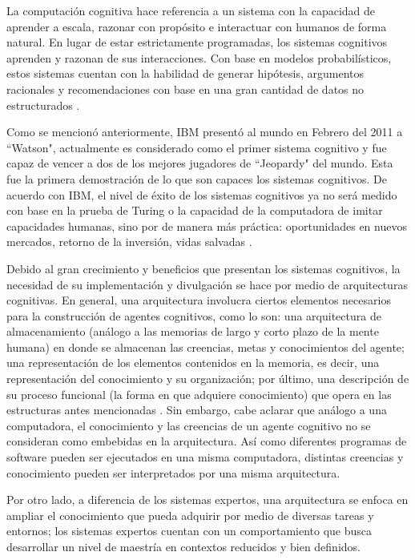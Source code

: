 La computaci\'{o}n cognitiva hace referencia a un sistema con la capacidad de aprender a escala, razonar con prop\'{o}sito e interactuar con humanos de forma natural. En lugar de estar estrictamente programadas, los sistemas cognitivos aprenden y razonan de sus interacciones. Con base en modelos probabil\'{i}sticos, estos sistemas cuentan con la habilidad de generar hip\'{o}tesis, argumentos racionales y recomendaciones con base en una gran cantidad de datos no estructurados \cite{ibmcc}.

Como se mencion\'{o} anteriormente, IBM present\'{o} al mundo en Febrero del 2011 a “Watson", actualmente es considerado como el primer sistema cognitivo y fue capaz de vencer a dos de los mejores jugadores de “Jeopardy" del mundo. Esta fue la primera demostraci\'{o}n de lo que son capaces los sistemas cognitivos. De acuerdo con IBM, el nivel de \'{e}xito de los sistemas cognitivos ya no ser\'{a} medido con base en la prueba de Turing o la capacidad de la computadora de imitar capacidades humanas, sino por de manera m\'{a}s pr\'{a}ctica: oportunidades en nuevos mercados, retorno de la inversi\'{o}n, vidas salvadas \cite{ibmcc}.

Debido al gran crecimiento y beneficios que presentan los sistemas cognitivos, la necesidad de su implementaci\'{o}n y divulgaci\'{o}n se hace por medio de arquitecturas cognitivas. En general, una arquitectura involucra ciertos elementos necesarios para la construcci\'{o}n de agentes cognitivos, como lo son: una arquitectura de almacenamiento (an\'{a}logo a las memorias de largo y corto plazo de la mente humana) en donde se almacenan las creencias, metas y conocimientos del agente; una representaci\'{o}n de los elementos contenidos en la memoria, es decir, una representaci\'{o}n del conocimiento y su organizaci\'{o}n; por \'{u}ltimo, una descripci\'{o}n de su proceso funcional (la forma en que adquiere conocimiento) que opera en las estructuras antes mencionadas \cite{langley2009cognitive}. Sin embargo, cabe aclarar que an\'{a}logo a una computadora, el conocimiento y las creencias de un agente cognitivo no se consideran como embebidas en la arquitectura. As\'{i} como diferentes programas de software pueden ser ejecutados en una misma computadora, distintas creencias y conocimiento pueden ser interpretados por una misma arquitectura.

Por otro lado, a diferencia de los sistemas expertos, una arquitectura se enfoca en ampliar el conocimiento que pueda adquirir por medio de diversas tareas y entornos; los sistemas expertos cuentan con un comportamiento que busca desarrollar un nivel de maestr\'{i}a en contextos reducidos y bien definidos.

